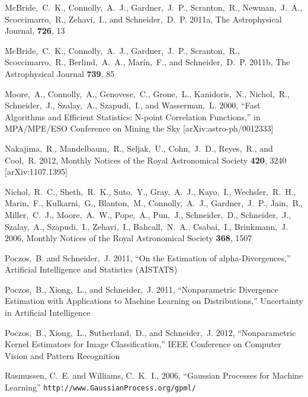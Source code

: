 \documentclass[prd, nofootinbib, floatfix, 12pt,tightenlines]{revtex4}
\begin{document}
\begin{thebibliography}{99}
McBride,~C.~K., Connolly,~A.~J., Gardner,~J.~P., Scranton,~R., Newman,~J.~A.,
Scoccimarro,~R., Zehavi,~I., and Schneider,~D.~P. 2011a, The Astrophysical
Journal, {\bf 726}, 13

McBride,~C.~K., Connolly,~A.~J., Gardner,~J.~P., Scranton,~R., Scoccimarro,~R.,
Berlind,~A.~A., Mar\'in,~F., and Schneider,~D.~P. 2011b, The Astrophysical
Journal {\bf 739}, 85

Moore,~A., Connolly,~A., Genovese,~C., Grone,~L., Kanidoris,~N., Nichol,~R.,
Schneider,~J., Szalay,~A., Szapudi,~I., and Wasserman,~L. 2000,
``Fast Algorithms and Efficient Statistics: N-point Correlation Functions,'' in
MPA/MPE/ESO Conference on Mining the Sky [arXiv:astro-ph/0012333]

Nakajima,~R., Mandelbaum,~R., Seljak,~U., Cohn,~J.~D., Reyes,~R., and
Cool,~R. 2012, Monthly Notices of the Royal Astronomical Society {\bf 420}, 3240
[arXiv:1107.1395]

Nichol,~R.~C., Sheth,~R.~K., Suto,~Y., Gray,~A.~J., Kayo,~I., Wechsler,~R.~H.,
Marin,~F., Kulkarni,~G., Blanton,~M., Connolly,~A.~J., Gardner,~J.~P., Jain,~B.,
Miller,~C.~J., Moore,~A.~W., Pope,~A., Pun,~J., Schneider,~D., Schneider,~J.,
Szalay,~A., Szapudi,~I., Zehavi,~I., Bahcall,~N.~A., Csabai,~I., Brinkmann,~J.
2006, Monthly Notices of the Royal Astronomical Society {\bf 368}, 1507

Poczos,~B. and Schneider,~J. 2011, ``On the Estimation of alpha-Divergences,''
Artificial Intelligence and Statistics (AISTATS)

Poczos,~B., Xiong,~L., and Schneider,~J. 2011, ``Nonparametric Divergence Estimation with
Applications to Machine Learning on Distributions,''  Uncertainty in Artificial
Intelligence

Poczos,~B., Xiong,~L., Sutherland,~D., and Schneider,~J. 2012,
``Nonparametric Kernel Estimators for Image Classification,''
IEEE Conference on Computer Vision and Pattern Recognition

Rasmussen, C.~E. and Williams, C.~K.~I., 2006, ``Gaussian
Processes for Machine Learning''
\verb|http://www.GaussianProcess.org/gpml/|


\end{thebibliography}
\end{document}
